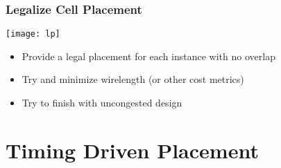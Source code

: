 \documentclass[compress]{beamer}
\begin{document}
\begin{frame}
	\frametitle{Legalize Cell Placement}
	\begin{center}
		\texttt{[image: lp]}
	\end{center}
\begin{itemize}
	\item Provide a legal placement for each instance with no overlap
	\item Try and minimize wirelength (or other cost metrics)
	\item Try to finish with uncongested design
\end{itemize}
\end{frame}

\section[TDP]{Timing Driven Placement}
\end{document}
